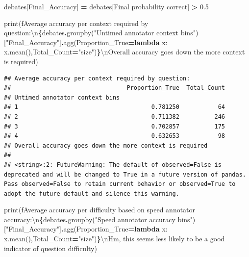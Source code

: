 \documentclass[
]{article}
\newenvironment{Shaded}{\begin{snugshade}}{\end{snugshade}}
\newcommand{\BuiltInTok}[1]{#1}
\newcommand{\CharTok}[1]{\textcolor[rgb]{0.31,0.60,0.02}{#1}}
\newcommand{\FloatTok}[1]{\textcolor[rgb]{0.00,0.00,0.81}{#1}}
\newcommand{\KeywordTok}[1]{\textcolor[rgb]{0.13,0.29,0.53}{\textbf{#1}}}
\newcommand{\NormalTok}[1]{#1}
\newcommand{\OperatorTok}[1]{\textcolor[rgb]{0.81,0.36,0.00}{\textbf{#1}}}
\newcommand{\SpecialCharTok}[1]{\textcolor[rgb]{0.81,0.36,0.00}{\textbf{#1}}}
\newcommand{\SpecialStringTok}[1]{\textcolor[rgb]{0.31,0.60,0.02}{#1}}
\newcommand{\StringTok}[1]{\textcolor[rgb]{0.31,0.60,0.02}{#1}}
\begin{document}
\begin{Shaded}
\begin{Highlighting}[]
\NormalTok{debates[}\StringTok{\textquotesingle{}Final\_Accuracy\textquotesingle{}}\NormalTok{] }\OperatorTok{=}\NormalTok{ debates[}\StringTok{\textquotesingle{}Final probability correct\textquotesingle{}}\NormalTok{] }\OperatorTok{\textgreater{}} \FloatTok{0.5}

\BuiltInTok{print}\NormalTok{(}\SpecialStringTok{f\textquotesingle{}Average accuracy per context required by question:}\CharTok{\textbackslash{}n}\SpecialCharTok{\{}\NormalTok{debates}\SpecialCharTok{.}\NormalTok{groupby(}\StringTok{"Untimed annotator context bins"}\NormalTok{)[}\StringTok{"Final\_Accuracy"}\NormalTok{]}\SpecialCharTok{.}\NormalTok{agg(Proportion\_True}\OperatorTok{=}\KeywordTok{lambda}\NormalTok{ x: x.mean(),Total\_Count}\OperatorTok{=}\StringTok{"size"}\NormalTok{)}\SpecialCharTok{\}}\CharTok{\textbackslash{}n}\SpecialStringTok{Overall accuracy goes down the more context is required\textquotesingle{}}\NormalTok{)}
\end{Highlighting}
\end{Shaded}

\begin{verbatim}
## Average accuracy per context required by question:
##                                 Proportion_True  Total_Count
## Untimed annotator context bins                              
## 1                                      0.781250           64
## 2                                      0.711382          246
## 3                                      0.702857          175
## 4                                      0.632653           98
## Overall accuracy goes down the more context is required
## 
## <string>:2: FutureWarning: The default of observed=False is deprecated and will be changed to True in a future version of pandas. Pass observed=False to retain current behavior or observed=True to adopt the future default and silence this warning.
\end{verbatim}

\begin{Shaded}
\begin{Highlighting}[]
\BuiltInTok{print}\NormalTok{(}\SpecialStringTok{f\textquotesingle{}Average accuracy per difficulty based on speed annotator accuracy:}\CharTok{\textbackslash{}n}\SpecialCharTok{\{}\NormalTok{debates}\SpecialCharTok{.}\NormalTok{groupby(}\StringTok{"Speed annotator accuracy bins"}\NormalTok{)[}\StringTok{"Final\_Accuracy"}\NormalTok{]}\SpecialCharTok{.}\NormalTok{agg(Proportion\_True}\OperatorTok{=}\KeywordTok{lambda}\NormalTok{ x: x.mean(),Total\_Count}\OperatorTok{=}\StringTok{"size"}\NormalTok{)}\SpecialCharTok{\}}\CharTok{\textbackslash{}n}\SpecialStringTok{Hm, this seems less likely to be a good indicator of question difficulty\textquotesingle{}}\NormalTok{)}
\end{Highlighting}
\end{Shaded}
\end{document}
